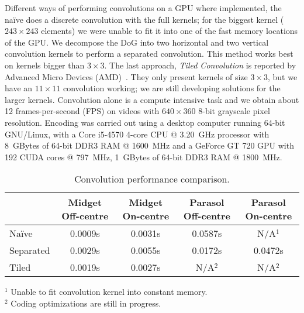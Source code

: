 Different ways of performing convolutions on a GPU where implemented, the naïve
does a discrete convolution with the full kernels; for the biggest kernel 
($243\times243$ elements) we were unable to fit it into one of the fast memory
locations of the GPU. We decompose the DoG into two horizontal and two vertical
convolution kernels to perform a separated convolution. This method works best 
on kernels bigger than $3\times3$. The last approach, \emph{Tiled Convolution} 
is reported by Advanced Micro Devices (AMD)~\cite{tiled-convolution}. They only 
present kernels of size $3\times3$, but we have an $11\times11$ convolution 
working; we are still developing solutions for the larger kernels.
Convolution alone is a compute intensive task and we 
obtain about 12 frames-per-second (FPS) on videos with $640\times360$ 8-bit 
grayscale pixel resolution. Encoding was carried out using a desktop computer 
running 64-bit GNU/Linux, with a Core i5-4570 4-core CPU @ 3.20~GHz processor 
with 8~GBytes of 64-bit DDR3 RAM @ 1600~MHz and a GeForce GT 720 GPU with 192 
CUDA cores @ 797~MHz, 1~GBytes of 64-bit DDR3 RAM @ 1800~MHz. %

\begin{table}
  \begin{center}
      \caption{Convolution performance comparison.}
      \bgroup
      \def\arraystretch{1.2}
      \begin{tabular}{l c c c c}
        &
        \begin{minipage}{1.2cm}Midget Off-centre\vspace*{0.05cm}\end{minipage} & 
        \begin{minipage}{1.2cm}Midget On-centre\vspace*{0.05cm}\end{minipage}& 
        \begin{minipage}{1.2cm}Parasol Off-centre\vspace*{0.05cm}\end{minipage}& 
        \begin{minipage}{1.2cm}Parasol On-centre\vspace*{0.05cm}\end{minipage}\\
        \hline 
        \vspace*{0.1cm}
        Naïve     & 0.0009s & 0.0031s & 0.0587s & N/A$^1$ \\ 
        Separated & 0.0029s & 0.0055s & 0.0172s & 0.0472s \\ 
        Tiled     & 0.0019s & 0.0027s & N/A$^2$ & N/A$^2$\\
      \end{tabular} 
      \egroup
  {
    \footnotesize $^1$ Unable to fit convolution kernel into constant memory.\\
                  $^2$ Coding optimizations are still in progress.
  }
  \end{center}
  \vspace*{-5pt}
\end{table}


